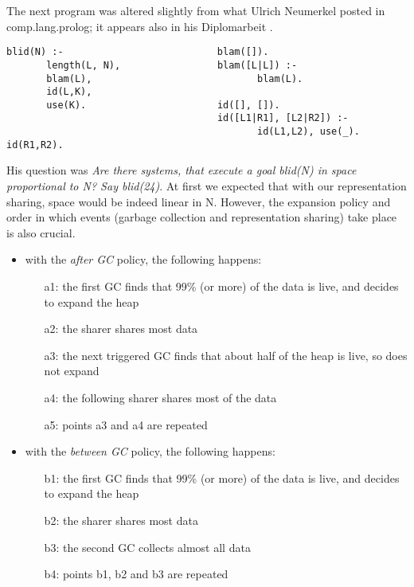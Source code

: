 \documentclass{tlp}
\begin{document}
\begin{sloppypar}
The next program was altered slightly from what Ulrich Neumerkel
posted in comp.lang.prolog; it appears also in his Diplomarbeit
\cite{neumerkeldiplomarbeit}.
\end{sloppypar}
\begin{Verbatim}[fontsize=\small, frame=single,samepage=true]
blid(N) :-                           blam([]).
       length(L, N),                 blam([L|L]) :-
       blam(L),                             blam(L).
       id(L,K),                     
       use(K).                       id([], []).
                                     id([L1|R1], [L2|R2]) :-
                                            id(L1,L2), use(_).                                     id(R1,R2). \end{Verbatim}
His question was {\em Are there systems, that execute a goal blid(N)
in space proportional to N?  Say blid(24)}. At first we expected that
with our representation sharing, space would be indeed linear in
N. However, the expansion policy and order in which events (garbage
collection and representation sharing) take place is also crucial. 
\begin{itemize}
\item 
with the {\em after GC} policy, the following happens:
\begin{itemize}
\item[a1:] 
the first GC finds that 99\% (or more) of the data is live, and
decides to expand the heap
\item[a2:] 
the sharer shares most data
\item[a3:] 
the next triggered GC finds that about half of the heap is live, so
does not expand
\item[a4:]
the following sharer shares most of the data
\item[a5:] 
points a3 and a4 are repeated
\end{itemize}

\item 
with the {\em between GC} policy, the following happens:
\begin{itemize}
\item[b1:] 
the first GC finds that 99\% (or more) of the data is live, and
decides to expand the heap
\item[b2:] 
the sharer shares most data
\item[b3:] 
the second GC collects almost all data
\item[b4:]
points b1, b2 and b3 are repeated
\end{itemize}


\end{itemize}
\end{document}

